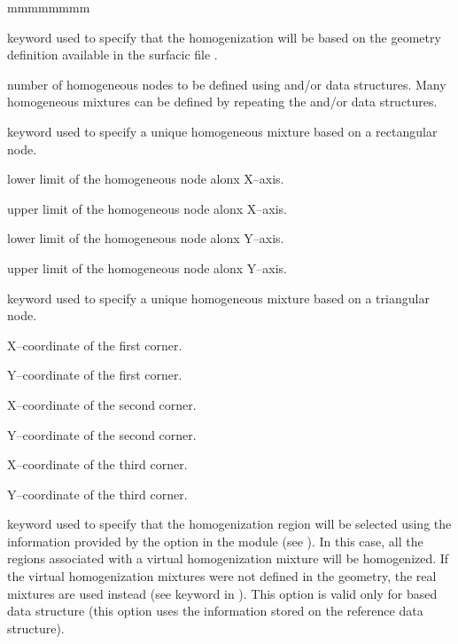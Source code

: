 \begin{ListeDeDescription}{mmmmmmmm}
\item[\moc{G2S}] keyword used to specify that the homogenization will be based on the geometry definition available in the surfacic
file .

\item[\dusa{nhom}] number of homogeneous nodes to be defined using  and/or  data structures. Many homogeneous mixtures can be defined by
repeating the  and/or  data structures.

\item[\moc{RECT}] keyword used to specify a unique homogeneous mixture based on a rectangular node. 

\item[\dusa{xm}] lower limit of the homogeneous node alonx X--axis.

\item[\dusa{xp}] upper limit of the homogeneous node alonx X--axis.

\item[\dusa{ym}] lower limit of the homogeneous node alonx Y--axis.

\item[\dusa{yp}] upper limit of the homogeneous node alonx Y--axis.

\item[\moc{TRIA}] keyword used to specify a unique homogeneous mixture based on a triangular node.

\item[\dusa{x1}] X--coordinate of the first corner.

\item[\dusa{y1}] Y--coordinate of the first corner.

\item[\dusa{x2}] X--coordinate of the second corner.

\item[\dusa{y2}] Y--coordinate of the second corner.

\item[\dusa{x3}] X--coordinate of the third corner.

\item[\dusa{y3}] Y--coordinate of the third corner.

\item[\moc{HMIX}] keyword used to specify that the homogenization region will be selected using the information provided by the  option in the  module (see ). In this case, all the regions associated with a virtual homogenization mixture will be homogenized. If the virtual homogenization mixtures were not defined in the geometry, the real mixtures are used instead (see  keyword in ). This option is valid only for  based  data structure (this option uses the information stored on the reference  data structure).


\end{ListeDeDescription}

